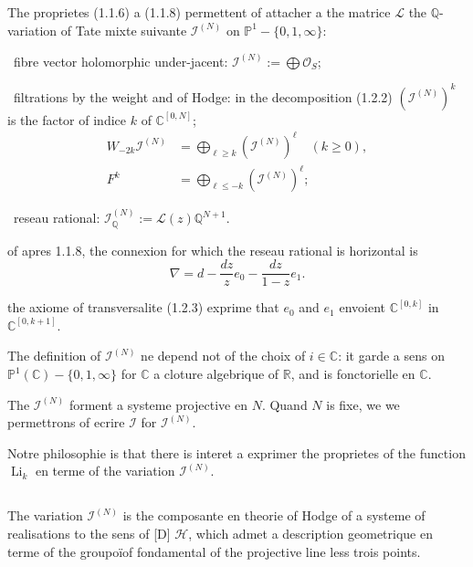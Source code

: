 \documentclass[12pt,a4paper]{article}
\theoremstyle{plain}
\theoremstyle{definition}
\theoremstyle{remark}
\newcommand{\Q}{\mathbb{Q}}
\newcommand{\R}{\mathbb{R}}
\newcommand{\C}{\mathbb{C}}
\newcommand{\IP}{\mathbb{P}}
\begin{document}
\subsection{}

The propri{e}t{e}s (1.1.6) {a} (1.1.8) permettent of attacher {a} the matrice $\mathcal{L}$ the $\Q$-variation of Tate mixte suivante $\mathcal{I}^{(N)}$ on $\IP^1-\{0,1,\infty\}$:

\textbullet\ fibr{e} vector holomorphic under-jacent: $\mathcal{I}^{(N)}:=\bigoplus\mathcal{O}_S$;

\textbullet\ filtrations by the weight and of Hodge: in the d{e}composition (1.2.2) $(\mathcal{I}^{(N)})^k$ is the factor of indice $k$ of $\C^{[0,N]}$;
\begin{align*}
W_{-2k}\mathcal{I}^{(N)} &= \bigoplus_{\ell\geq k}(\mathcal{I}^{(N)})^\ell \quad (k\geq 0),\\
F^k &= \bigoplus_{\ell\leq -k}(\mathcal{I}^{(N)})^\ell;
\end{align*}

\textbullet\ r{e}seau rational: $\mathcal{I}_\Q^{(N)} := \mathcal{L}(z)\Q^{N+1}$.

of apr{e}s 1.1.8, the connexion for which the r{e}seau rational is horizontal is
\begin{equation*}
\nabla = d - \frac{dz}{z}e_0 - \frac{dz}{1-z}e_1.
\end{equation*}

the axiome of transversalit{e} (1.2.3) exprime that $e_0$ and $e_1$ envoient $\C^{[0,k]}$ in $\C^{[0,k+1]}$.

The d{e}finition of $\mathcal{I}^{(N)}$ ne d{e}pend not of the choix of $i\in\C$: it garde a sens on $\IP^1(\C)-\{0,1,\infty\}$ for $\C$ a cl{o}ture alg{e}brique of $\R$, and is fonctorielle en $\C$.

The $\mathcal{I}^{(N)}$ forment a syst{e}me projective en $N$. Quand $N$ is fix{e}, we we permettrons of {e}crire $\mathcal{I}$ for $\mathcal{I}^{(N)}$.

Notre philosophie is that there is int{e}r{e}t {a} exprimer the propri{e}t{e}s of the function $\operatorname{Li}_k$ en terme of the variation $\mathcal{I}^{(N)}$.

\subsection{}

The variation $\mathcal{I}^{(N)}$ is the composante en th{e}orie of Hodge of a syst{e}me of r{e}alisations to the sens of [D] $\mathcal{H}$, which admet a description g{e}om{e}trique en terme of the groupo{\"i}of fondamental of the projective line less trois points.
\end{document}
